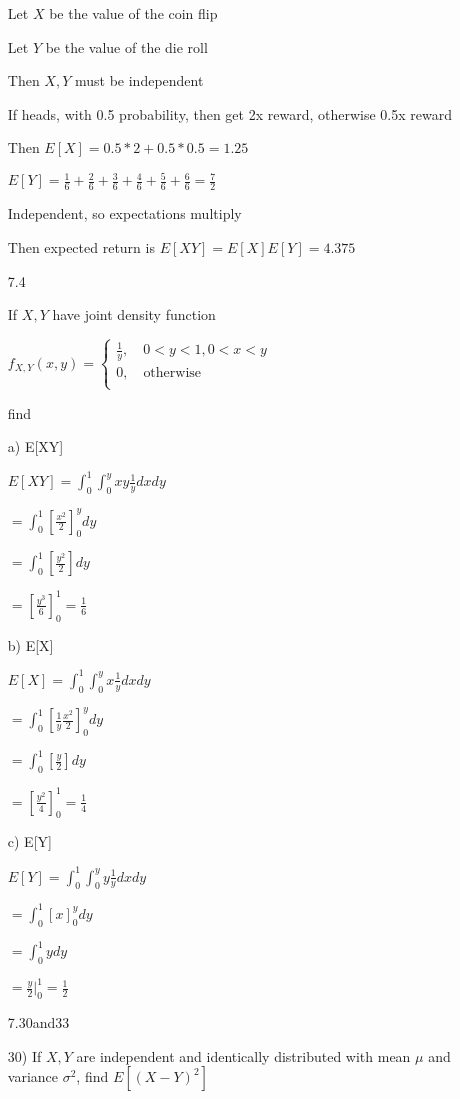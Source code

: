 \documentclass[11pt]{article}
\begin{document}
\begin{itemize}
	Let $X$ be the value of the coin flip

	Let $Y$ be the value of the die roll

	Then $X,Y$ must be independent

	If heads, with 0.5 probability, then get 2x reward, otherwise 0.5x reward

	Then $E[X] = 0.5*2 + 0.5*0.5 = 1.25$

	$E[Y] = \frac{1}{6} + \frac{2}{6} + \frac{3}{6} + \frac{4}{6} + \frac{5}{6} + \frac{6}{6} = \frac{7}{2}$

	Independent, so expectations multiply

	Then expected return is $E[XY] = E[X]E[Y] = 4.375$

\item[7.4]

	If $X,Y$ have joint density function

	$f_{X,Y}(x,y) = \begin{cases}
		\frac{1}{y}, \quad 0<y<1, 0<x<y\\

		0, \quad\text{otherwise}\\
	\end{cases}$

	find

	a) E[XY]

	$E[XY] = \int_0^1 \int_0^y xy\frac{1}{y} dxdy$

	$=\int_0^1 [\frac{x^2}{2}]_0^y dy$

	$=\int_0^1 [\frac{y^2}{2}]dy$

	$=[\frac{y^3}{6}]_0^1 = \frac{1}{6}$

	b) E[X]

	$E[X] = \int_0^1 \int_0^y x\frac{1}{y} dxdy$

	$= \int_0^1 [\frac{1}{y} \frac{x^2}{2}]_0^y dy$

	$= \int_0^1 [\frac{y}{2}]dy$

	$= [\frac{y^2}{4}]_0^1 = \frac{1}{4}$

	c) E[Y]

	$E[Y] = \int_0^1 \int_0^y y\frac{1}{y} dxdy$

	$=\int_0^1 [x]_0^y dy$

	$=\int_0^1 y dy$

	$=\frac{y}{2}|_0^1 = \frac{1}{2}$
\item[7.30and33]

	30) If $X,Y$ are independent and identically distributed with mean $\mu$ and variance $\sigma^2$, find $E[(X-Y)^2]$


\end{itemize}
\end{document}
